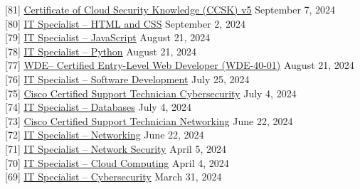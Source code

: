 \documentclass[10pt]{res} %
\begin{document}
\begin{resume}
{[81]} \phantom{0}\href{https://www.credly.com/badges/fc36d5a8-9e08-4022-9593-0b93ec0d2068}{\color{blue}Certificate of Cloud Security Knowledge (CCSK) v5} \hfill September 7, 2024 \\
{[80]} \phantom{0}\href{https://www.credly.com/badges/f6a8b83c-0e52-4fee-b116-ae13dc857c20}{\color{blue}IT Specialist -- HTML and CSS} \hfill September 2, 2024 \\
{[79]} \phantom{0}\href{https://www.credly.com/badges/b40e3f6c-867f-47c5-8986-c7936c05a9c9}{\color{blue}IT Specialist -- JavaScript} \hfill August 21, 2024 \\
{[78]} \phantom{0}\href{https://www.credly.com/badges/8ff4c08f-9128-401b-99d4-53d847e4f336}{\color{blue}IT Specialist -- Python} \hfill August 21, 2024 \\
{[77]} \phantom{0}\href{https://www.credly.com/badges/86befc3a-dcb6-412d-b9be-0f9439ff95d4}{\color{blue}WDE\texttrademark\phantom{0}-- Certified Entry-Level Web Developer (WDE-40-01)} \hfill August 21, 2024 \\
{[76]} \phantom{0}\href{https://www.credly.com/badges/c3a734d5-aac5-4f02-af9f-db7dc66ff404}{\color{blue}IT Specialist -- Software Development} \hfill July 25, 2024 \\
{[75]} \phantom{0}\href{https://www.credly.com/badges/7fcb5295-5252-4e3f-a9d3-3eb6d35b3227}{\color{blue}Cisco Certified Support Technician Cybersecurity} \hfill July 4, 2024 \\
{[74]} \phantom{0}\href{https://www.credly.com/badges/e414a48e-f7c3-4885-9ad1-9fb8a5e888ac}{\color{blue}IT Specialist -- Databases} \hfill July 4, 2024 \\
{[73]} \phantom{0}\href{https://www.credly.com/badges/6dac1d37-6fa9-4e98-ae8f-743362967782}{\color{blue}Cisco Certified Support Technician Networking} \hfill June 22, 2024 \\
{[72]} \phantom{0}\href{https://www.credly.com/badges/cefce73d-87b6-47c2-b8fa-7ae36589037a}{\color{blue}IT Specialist -- Networking} \hfill June 22, 2024 \\
{[71]} \phantom{0}\href{https://www.credly.com/badges/bde68de3-c393-4245-a7c1-e4304f9e1e70}{\color{blue}IT Specialist -- Network Security} \hfill April 5, 2024 \\
{[70]} \phantom{0}\href{https://www.credly.com/badges/6a2168dd-2a47-4928-b4b0-82083a33c412}{\color{blue}IT Specialist -- Cloud Computing} \hfill April 4, 2024 \\
{[69]} \phantom{0}\href{https://www.credly.com/badges/af96485b-b5ef-491a-8659-b4ac80a7c41c}{\color{blue}IT Specialist -- Cybersecurity} \hfill March 31, 2024 \\

\end{resume}
\end{document}
